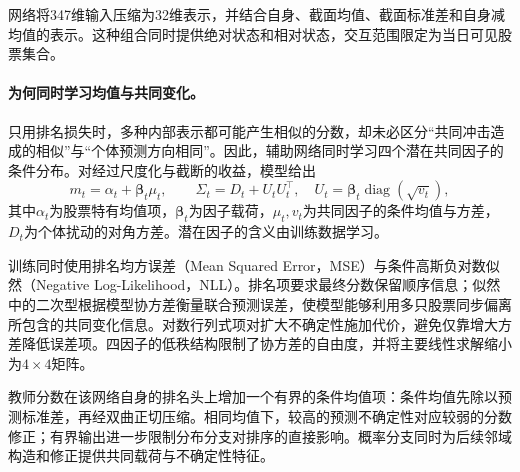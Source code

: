 \documentclass[UTF8,11pt,a4paper,fontset=fandol]{ctexart}
\newcommand{\Beta}{\bm{\beta}}
\newcommand{\diag}{\operatorname{diag}}
\begin{document}
网络将347维输入压缩为32维表示，并结合自身、截面均值、截面标准差和自身减均值的表示。这种组合同时提供绝对状态和相对状态，交互范围限定为当日可见股票集合。

\paragraph{为何同时学习均值与共同变化。}
只用排名损失时，多种内部表示都可能产生相似的分数，却未必区分“共同冲击造成的相似”与“个体预测方向相同”。因此，辅助网络同时学习四个潜在共同因子的条件分布。对经过尺度化与截断的收益，模型给出
\begin{equation}
 m_t=\alpha_t+\Beta_t\mu_t,\qquad
 \Sigma_t=D_t+U_tU_t^\top,\quad U_t=\Beta_t\diag(\sqrt{v_t}),
 \label{eq:factor}
\end{equation}
其中$\alpha_t$为股票特有均值项，$\Beta_t$为因子载荷，$\mu_t,v_t$为共同因子的条件均值与方差，$D_t$为个体扰动的对角方差。潜在因子的含义由训练数据学习。

训练同时使用排名均方误差（Mean Squared Error，MSE）与条件高斯负对数似然（Negative Log-Likelihood，NLL）。排名项要求最终分数保留顺序信息；似然中的二次型根据模型协方差衡量联合预测误差，使模型能够利用多只股票同步偏离所包含的共同变化信息。对数行列式项对扩大不确定性施加代价，避免仅靠增大方差降低误差项。四因子的低秩结构限制了协方差的自由度，并将主要线性求解缩小为$4\times4$矩阵。

教师分数在该网络自身的排名头上增加一个有界的条件均值项：条件均值先除以预测标准差，再经双曲正切压缩。相同均值下，较高的预测不确定性对应较弱的分数修正；有界输出进一步限制分布分支对排序的直接影响。概率分支同时为后续邻域构造和修正提供共同载荷与不确定性特征。
\end{document}
